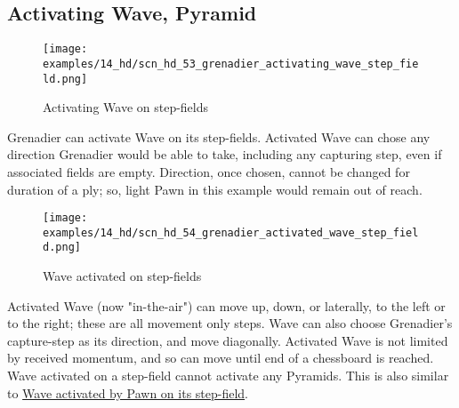 \clearpage %

\subsection*{Activating Wave, Pyramid}
\label{sec:Hemera's Dawn/Grenadier/Activating Wave, Pyramid}

\vspace*{-1.4\baselineskip}
\noindent
\begin{figure}[!h]
\texttt{[image: examples/14\_hd/scn\_hd\_53\_grenadier\_activating\_wave\_step\_field.png]}
\vspace*{-1.4\baselineskip}
\caption{Activating Wave on step-fields}
\label{fig:scn_hd_53_grenadier_activating_wave_step_field}
\end{figure}

\vspace*{-0.5\baselineskip}
Grenadier can activate Wave on its step-fields. Activated Wave can chose any
direction Grenadier would be able to take, including any capturing step, even if
associated fields are empty.\newline
\indent
Direction, once chosen, cannot be changed for duration of a ply; so, light Pawn
in this example would remain out of reach.

\clearpage %

\vspace*{-2.1\baselineskip}
\noindent
\begin{figure}[!h]
\texttt{[image: examples/14\_hd/scn\_hd\_54\_grenadier\_activated\_wave\_step\_field.png]}
\vspace*{-1.4\baselineskip}
\caption{Wave activated on step-fields}
\label{fig:scn_hd_54_grenadier_activated_wave_step_field}
\end{figure}

\vspace*{-0.5\baselineskip}
Activated Wave (now "in-the-air") can move up, down, or laterally, to the left or
to the right; these are all movement only steps. Wave can also choose Grenadier’s
capture-step as its direction, and move diagonally.\newline
\indent
Activated Wave is not limited by received momentum, and so can move until end of
a chessboard is reached. Wave activated on a step-field cannot activate any Pyramids.\newline
\indent
This is also similar to
\hyperref[fig:scn_n_17_sideways_pawn_activated_wave]{Wave activated by Pawn on its step-field}.

